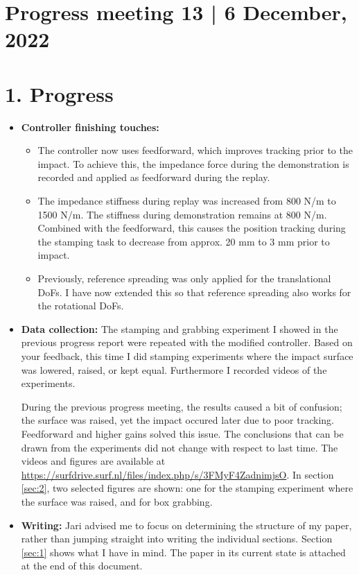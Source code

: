 \documentclass[11pt]{report}
\numberwithin{equation}{section}        %
\numberwithin{figure}{section}          %
\numberwithin{table}{section}           %
\begin{document}
  \section*{Progress meeting 13 | 6 December, 2022}


  \section*{1. Progress}
  \begin{itemize}
  \item \textbf{Controller finishing touches:}
      \begin{itemize}
        \item The controller now uses feedforward, which improves tracking prior to the impact. To achieve this, the impedance force during the demonstration is recorded and applied as feedforward during the replay.
        \item The impedance stiffness during replay was increased from 800 N/m to 1500 N/m. The stiffness during demonstration remains at 800 N/m. Combined with the feedforward, this causes the position tracking during the stamping task to decrease from approx. 20 mm to 3 mm prior to impact.
        \item Previously, reference spreading was only applied for the translational DoFs. I have now extended this so that reference spreading also works for the rotational DoFs.

      \end{itemize}
      
      \item \textbf{Data collection:} The stamping and grabbing experiment I showed in the previous progress report were repeated with the modified controller. Based on your feedback, this time I did stamping experiments where the impact surface was lowered, raised, or kept equal. Furthermore I recorded videos of the experiments.

      During the previous progress meeting, the results caused a bit of confusion; the surface was raised, yet the impact occured later due to poor tracking. Feedforward and higher gains solved this issue. The conclusions that can be drawn from the experiments did not change with respect to last time. The videos and figures are available at \url{https://surfdrive.surf.nl/files/index.php/s/3FMyF4ZadnimjsO}. In section \ref{sec:2}, two selected figures are shown: one for the stamping experiment where the surface was raised, and for box grabbing.

      \item \textbf{Writing:} Jari advised me to focus on determining the structure of my paper, rather than jumping straight into writing the individual sections. Section \ref{sec:1} shows what I have in mind. The paper in its current state is attached at the end of this document. 

     
  \end{itemize}
\end{document}

